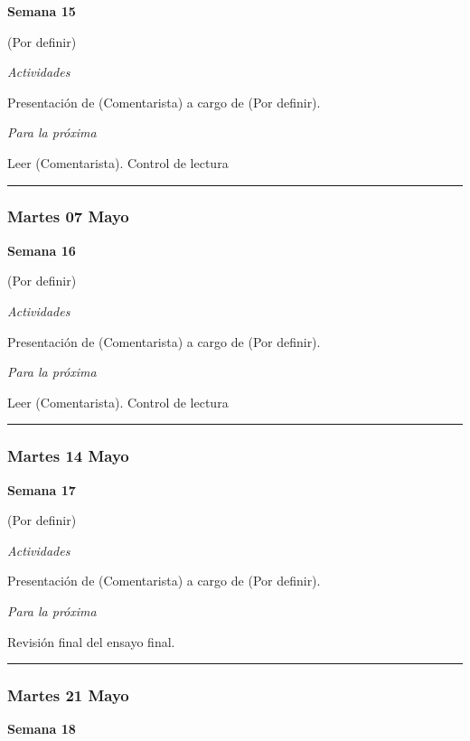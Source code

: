 \documentclass[spanish,]{article}
\begin{document}
\textbf{Semana 15}

(Por definir)

\emph{Actividades}

Presentación de (Comentarista) a cargo de (Por definir).

\emph{Para la próxima}

Leer (Comentarista). Control de lectura

\begin{center}\rule{0.5\linewidth}{\linethickness}\end{center}

\subsubsection{Martes 07 Mayo}\label{martes-07-mayo}

\textbf{Semana 16}

(Por definir)

\emph{Actividades}

Presentación de (Comentarista) a cargo de (Por definir).

\emph{Para la próxima}

Leer (Comentarista). Control de lectura

\begin{center}\rule{0.5\linewidth}{\linethickness}\end{center}

\subsubsection{Martes 14 Mayo}\label{martes-14-mayo}

\textbf{Semana 17}

(Por definir)

\emph{Actividades}

Presentación de (Comentarista) a cargo de (Por definir).

\emph{Para la próxima}

Revisión final del ensayo final.

\begin{center}\rule{0.5\linewidth}{\linethickness}\end{center}

\subsubsection{Martes 21 Mayo}\label{martes-21-mayo}

\textbf{Semana 18}
\end{document}
